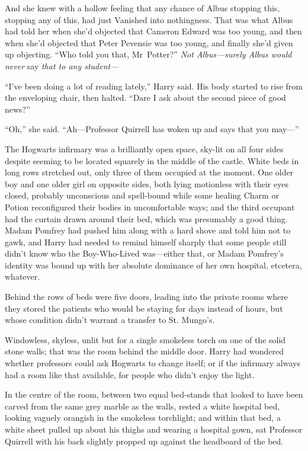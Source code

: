 And she knew with a hollow feeling that any chance of Albus stopping this, stopping any of this, had just Vanished into nothingness. That was what Albus had told her when she’d objected that Cameron Edward was too young, and then when she’d objected that Peter Pevensie was too young, and finally she’d given up objecting. “Who told you that, Mr~Potter?” \emph{Not Albus—surely Albus would never} say \emph{that to any student—}

“I’ve been doing a lot of reading lately,” Harry said. His body started to rise from the enveloping chair, then halted. “Dare I ask about the second piece of good news?”

“Oh,” she said. “Ah—Professor Quirrell has woken up and says that you may—”

\later

The Hogwarts infirmary was a brilliantly open space, sky-lit on all four sides despite seeming to be located squarely in the middle of the castle. White beds in long rows stretched out, only three of them occupied at the moment. One older boy and one older girl on opposite sides, both lying motionless with their eyes closed, probably unconscious and spell-bound while some healing Charm or Potion reconfigured their bodies in uncomfortable ways; and the third occupant had the curtain drawn around their bed, which was presumably a good thing. Madam Pomfrey had pushed him along with a hard shove and told him not to gawk, and Harry had needed to remind himself sharply that some people still didn’t know who the Boy-Who-Lived was—either that, or Madam Pomfrey’s identity was bound up with her absolute dominance of her own hospital, etcetera, whatever.

Behind the rows of beds were five doors, leading into the private rooms where they stored the patients who would be staying for days instead of hours, but whose condition didn’t warrant a transfer to St. Mungo’s.

Windowless, skyless, unlit but for a single smokeless torch on one of the solid stone walls; that was the room behind the middle door. Harry had wondered whether professors could ask Hogwarts to change itself; or if the infirmary always had a room like that available, for people who didn’t enjoy the light.

In the centre of the room, between two equal bed-stands that looked to have been carved from the same grey marble as the walls, rested a white hospital bed, looking vaguely orangish in the smokeless torchlight; and within that bed, a white sheet pulled up about his thighs and wearing a hospital gown, sat Professor Quirrell with his back slightly propped up against the headboard of the bed.

